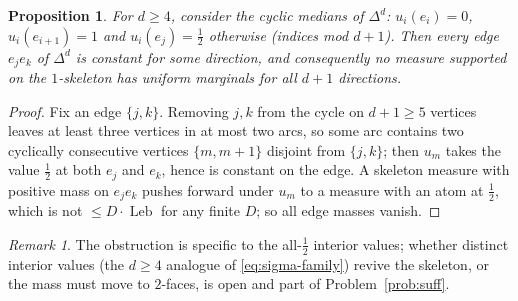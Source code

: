 \documentclass[11pt,reqno]{amsart}
\theoremstyle{plain}
\newtheorem{proposition}[theorem]{Proposition}
\theoremstyle{definition}
\theoremstyle{remark}
\newtheorem{remark}[theorem]{Remark}
\newcommand{\Leb}{\operatorname{Leb}}
\begin{document}
\begin{proposition}\label{prop:skelobstruction}
For $d\ge4$, consider the cyclic medians of $\Delta^d$: $u_i(e_i)=0$,
$u_i(e_{i+1})=1$ and $u_i(e_j)=\tfrac12$ otherwise (indices mod $d+1$). Then
\emph{every} edge $e_je_k$ of $\Delta^d$ is constant for some direction, and
consequently no measure supported on the $1$-skeleton has uniform marginals for
all $d+1$ directions.
\end{proposition}

\begin{proof}
Fix an edge $\{j,k\}$. Removing $j,k$ from the cycle on $d+1\ge5$ vertices
leaves at least three vertices in at most two arcs, so some arc contains two
cyclically consecutive vertices $\{m,m+1\}$ disjoint from $\{j,k\}$; then $u_m$
takes the value $\tfrac12$ at both $e_j$ and $e_k$, hence is constant on the
edge. A skeleton measure with positive mass on $e_je_k$ pushes forward under
$u_m$ to a measure with an atom at $\tfrac12$, which is not $\le D\cdot\Leb$ for
any finite $D$; so all edge masses vanish.
\end{proof}

\begin{remark}
The obstruction is specific to the all-$\tfrac12$ interior values; whether
distinct interior values (the $d\ge4$ analogue of
\eqref{eq:sigma-family}) revive the skeleton, or the mass must move to
$2$-faces, is open and part of Problem~\ref{prob:suff}.
\end{remark}
\end{document}
